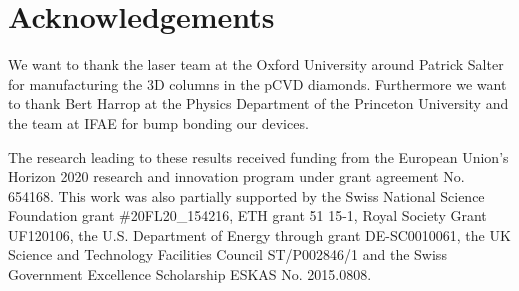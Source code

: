 \section*{Acknowledgements} 
We want to thank the laser team at the Oxford University around Patrick Salter for manufacturing the 3D columns in the \ac{pCVD} diamonds. Furthermore we want to thank Bert Harrop at the Physics Department of the Princeton University and the team at IFAE for bump bonding our devices.\par
The research leading to these results received funding from the European Union's Horizon 2020 research and innovation program under grant agreement No. 654168. This work was also partially supported by the Swiss National Science Foundation grant \#20FL20\_154216, ETH grant 51 15-1, Royal Society Grant UF120106, the U.S. Department of Energy through grant DE-SC0010061, the UK Science and Technology Facilities Council ST/P002846/1 and the  Swiss Government Excellence Scholarship ESKAS No. 2015.0808.
